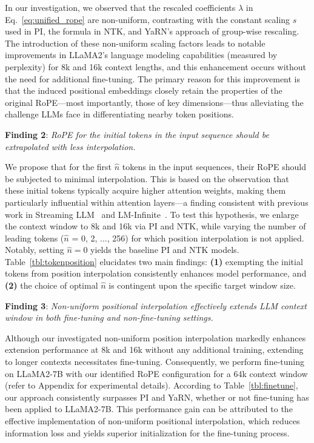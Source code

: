 In our investigation, we observed that the rescaled coefficients $\lambda$ in Eq.~\ref{eq:unified_rope} are non-uniform, contrasting with the constant scaling $s$ used in PI, the formula in NTK, and YaRN’s approach of group-wise rescaling. The introduction of these non-uniform scaling factors leads to notable improvements in LLaMA2’s language modeling capabilities (measured by perplexity) for 8k and 16k context lengths, and this enhancement occurs without the need for additional fine-tuning. The primary reason for this improvement is that the induced positional embeddings closely retain the properties of the original RoPE—most importantly, those of key dimensions—thus alleviating the challenge LLMs face in differentiating nearby token positions.

\textbf{Finding 2}: \textit{RoPE for the initial tokens in the input sequence should be extrapolated with less interpolation.} 

We propose that for the first $\hat{n}$ tokens in the input sequences, their RoPE should be subjected to minimal interpolation. This is based on the observation that these initial tokens typically acquire higher attention weights, making them particularly influential within attention layers—a finding consistent with previous work in Streaming LLM~\cite{streamingllm} and LM-Infinite~\cite{han2023lminfinite}. To test this hypothesis, we enlarge the context window to 8k and 16k via PI and NTK, while varying the number of leading tokens ($\hat n$ = 0, 2, ..., 256) for which position interpolation is not applied. Notably, setting $\hat n = 0$ yields the baseline PI and NTK models. Table~\ref{tbl:tokenposition} elucidates two main findings: \textbf{(1)} exempting the initial tokens from position interpolation consistently enhances model performance, and \textbf{(2)} the choice of optimal $\hat n$ is contingent upon the specific target window size.

\textbf{Finding 3}: \textit{Non-uniform positional interpolation effectively extends LLM context window in both fine-tuning and non-fine-tuning settings.} 

Although our investigated non-uniform position interpolation markedly enhances extension performance at 8k and 16k without any additional training, extending to longer contexts necessitates fine-tuning. Consequently, we perform fine-tuning on LLaMA2-7B with our identified RoPE configuration for a 64k context window (refer to Appendix for experimental details). According to Table~\ref{tbl:finetune}, our approach consistently surpasses PI and YaRN, whether or not fine-tuning has been applied to LLaMA2-7B. This performance gain can be attributed to the effective implementation of non-uniform positional interpolation, which reduces information loss and yields superior initialization for the fine-tuning process.

